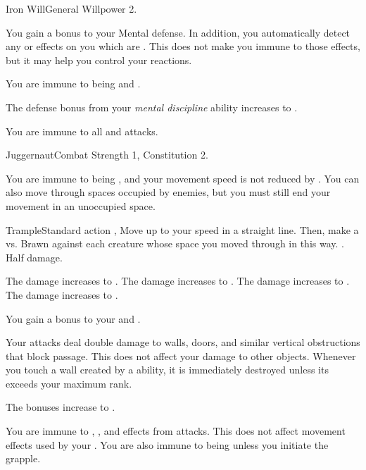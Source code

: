   \begin{feat}{Iron Will}{General}
    \featpre Willpower 2.

     You gain a  bonus to your Mental defense.
    In addition, you automatically detect any  or  effects on you which are .
    This does not make you immune to those effects, but it may help you control your reactions.

     You are immune to being \stunned and \confused.

     The defense bonus from your \textit{mental discipline} ability increases to .

     You are immune to all  and  attacks.
  \end{feat}

  \begin{feat}{Juggernaut}{Combat}
    \featpre Strength 1, Constitution 2.

     You are immune to being \slowed, and your movement speed is not reduced by .
    You can also move through spaces occupied by enemies, but you must still end your movement in an unoccupied space.

    \begin{activeability}{Trample}{Standard action}
      \abilitytags {}, 
      \rankline
      Move up to your speed in a straight line.
      Then, make a  vs. Brawn against each creature whose space you moved through in this way.
      \hit \damagerankthree.
      \miss Half damage.

      \rankline
       The damage increases to \damagerankfour.
       The damage increases to \damagerankfive.
       The damage increases to \damageranksix.
       The damage increases to \damagerankseven.
    \end{activeability}

     You gain a  bonus to your  and .

     Your attacks deal double damage to walls, doors, and similar vertical obstructions that block passage.
    This does not affect your damage to other objects.
    Whenever you touch a wall created by a  ability, it is immediately destroyed unless its  exceeds your maximum rank.

     The bonuses increase to .

     You are immune to , , and  effects from attacks.
    This does not affect movement effects used by your .
    You are also immune to being \grappled unless you initiate the grapple.
  \end{feat}

